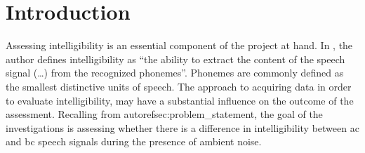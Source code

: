 \section{Introduction}\label{sec:method_intro}
Assessing intelligibility is an essential component of the project at hand. 
In \citep[p. 11]{cote_2011}, the author defines intelligibility as \enquote{the ability to extract the content of the speech signal (\dots) from the recognized phonemes}. Phonemes are commonly defined as the smallest distinctive units of speech.
The approach to acquiring data in order to evaluate intelligibility, may have a substantial influence on the outcome of the assessment.
Recalling from autorefsec:problem_statement, the goal of the investigations is assessing whether there is a difference in intelligibility between \gls{ac} and \gls{bc} speech signals during the presence of ambient noise. 

